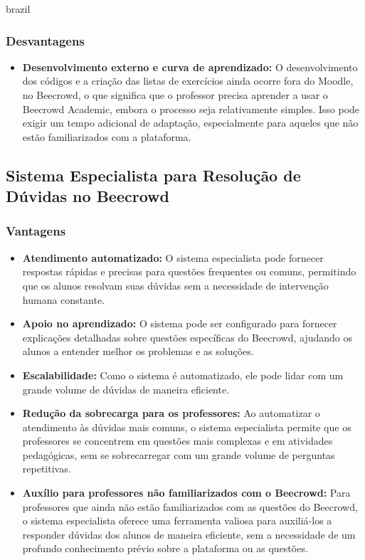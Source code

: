 \begin{otherlanguage*}{brazil}
\subsubsection{Desvantagens}
\begin{itemize}
    \item \textbf{Desenvolvimento externo e curva de aprendizado:} O desenvolvimento dos códigos e a criação das listas de exercícios ainda ocorre fora do Moodle, no Beecrowd, o que significa que o professor precisa aprender a usar o Beecrowd Academic, embora o processo seja relativamente simples. Isso pode exigir um tempo adicional de adaptação, especialmente para aqueles que não estão familiarizados com a plataforma.
\end{itemize}

\subsection{Sistema Especialista para Resolução de Dúvidas no Beecrowd}

\subsubsection{Vantagens}
\begin{itemize}
    \item \textbf{Atendimento automatizado:} O sistema especialista pode fornecer respostas rápidas e precisas para questões frequentes ou comuns, permitindo que os alunos resolvam suas dúvidas sem a necessidade de intervenção humana constante.
    \item \textbf{Apoio no aprendizado:} O sistema pode ser configurado para fornecer explicações detalhadas sobre questões específicas do Beecrowd, ajudando os alunos a entender melhor os problemas e as soluções.
    \item \textbf{Escalabilidade:} Como o sistema é automatizado, ele pode lidar com um grande volume de dúvidas de maneira eficiente.
    \item \textbf{Redução da sobrecarga para os professores:} Ao automatizar o atendimento às dúvidas mais comuns, o sistema especialista permite que os professores se concentrem em questões mais complexas e em atividades pedagógicas, sem se sobrecarregar com um grande volume de perguntas repetitivas.
    \item \textbf{Auxílio para professores não familiarizados com o Beecrowd:} Para professores que ainda não estão familiarizados com as questões do Beecrowd, o sistema especialista oferece uma ferramenta valiosa para auxiliá-los a responder dúvidas dos alunos de maneira eficiente, sem a necessidade de um profundo conhecimento prévio sobre a plataforma ou as questões.
\end{itemize}


\end{otherlanguage*}
